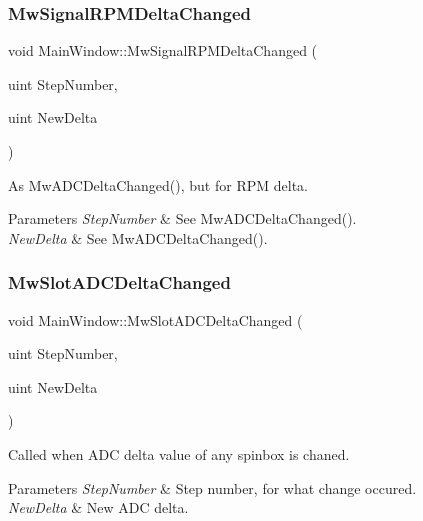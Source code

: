 \subsubsection{\texorpdfstring{Mw\+Signal\+R\+P\+M\+Delta\+Changed}{MwSignalRPMDeltaChanged}}
{\footnotesize\ttfamily void Main\+Window\+::\+Mw\+Signal\+R\+P\+M\+Delta\+Changed (\begin{DoxyParamCaption}\item[{uint}]{Step\+Number,  }\item[{uint}]{New\+Delta }\end{DoxyParamCaption})\hspace{0.3cm}{\ttfamily [signal]}}



As Mw\+A\+D\+C\+Delta\+Changed(), but for R\+PM delta. 


\begin{DoxyParams}{Parameters}
{\em Step\+Number} & See Mw\+A\+D\+C\+Delta\+Changed(). \\
\hline
{\em New\+Delta} & See Mw\+A\+D\+C\+Delta\+Changed(). \\
\hline
\end{DoxyParams}
\mbox{\label{class_main_window_a5778840f76f8ce6edd63d84b57b801b1}} 
\subsubsection{\texorpdfstring{Mw\+Slot\+A\+D\+C\+Delta\+Changed}{MwSlotADCDeltaChanged}}
{\footnotesize\ttfamily void Main\+Window\+::\+Mw\+Slot\+A\+D\+C\+Delta\+Changed (\begin{DoxyParamCaption}\item[{uint}]{Step\+Number,  }\item[{uint}]{New\+Delta }\end{DoxyParamCaption})\hspace{0.3cm}{\ttfamily [slot]}}



Called when A\+DC delta value of any spinbox is chaned. 


\begin{DoxyParams}{Parameters}
{\em Step\+Number} & Step number, for what change occured. \\
\hline
{\em New\+Delta} & New A\+DC delta. \\
\hline
\end{DoxyParams}


